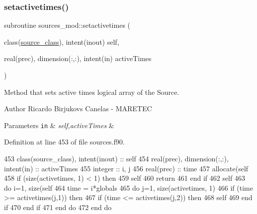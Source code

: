 \subsubsection{\texorpdfstring{setactivetimes()}{setactivetimes()}}
{\footnotesize\ttfamily subroutine sources\+\_\+mod\+::setactivetimes (\begin{DoxyParamCaption}\item[{class(\mbox{\hyperlink{structsources__mod_1_1source__class}{source\+\_\+class}}), intent(inout)}]{self,  }\item[{real(prec), dimension(\+:,\+:), intent(in)}]{active\+Times }\end{DoxyParamCaption})\hspace{0.3cm}{\ttfamily [private]}}



Method that sets active times logical array of the Source. 

\begin{DoxyAuthor}{Author}
Ricardo Birjukovs Canelas -\/ M\+A\+R\+E\+T\+EC 
\end{DoxyAuthor}

\begin{DoxyParams}[1]{Parameters}
\mbox{\tt in}  & {\em self,active\+Times} & \\
\hline
\end{DoxyParams}


Definition at line 453 of file sources.\+f90.


\begin{DoxyCode}
453     \textcolor{keywordtype}{class}(source\_class), \textcolor{keywordtype}{intent(inout)} :: self
454     \textcolor{keywordtype}{real(prec)}, \textcolor{keywordtype}{dimension(:,:)}, \textcolor{keywordtype}{intent(in)} :: activeTimes
455     \textcolor{keywordtype}{integer} :: i, j
456     \textcolor{keywordtype}{real(prec)} :: time
457     \textcolor{keyword}{allocate}(self%
458     \textcolor{keywordflow}{if} (\textcolor{keyword}{size}(activetimes, 1) < 1) \textcolor{keywordflow}{then}
459         self%
460         \textcolor{keywordflow}{return}
461 \textcolor{keywordflow}{    end if}
462     self%
463     \textcolor{keywordflow}{do} i=1, \textcolor{keyword}{size}(self%
464         time = i*globals%
465         \textcolor{keywordflow}{do} j=1, \textcolor{keyword}{size}(activetimes, 1)
466             \textcolor{keywordflow}{if} (time >= activetimes(j,1)) \textcolor{keywordflow}{then}
467                 \textcolor{keywordflow}{if} (time <= activetimes(j,2)) \textcolor{keywordflow}{then}
468                     self%
469 \textcolor{keywordflow}{                end if}
470 \textcolor{keywordflow}{            end if}
471 \textcolor{keywordflow}{        end do}
472 \textcolor{keywordflow}{    end do}
\end{DoxyCode}
\mbox{\label{namespacesources__mod_a9a62c41b71d2d6ad85def74087542ef5}} 
